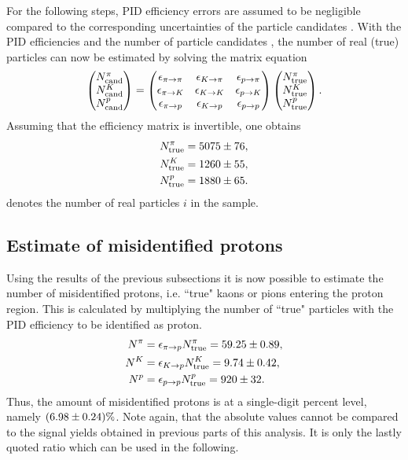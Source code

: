For the following steps, PID efficiency errors are assumed to be negligible compared to the corresponding uncertainties of the particle candidates .
With the PID efficiencies  and the number of particle candidates , the number of real (true) particles can now be estimated by solving the matrix equation
\begin{align*}
    \begin{pmatrix} 
        N_{\text{cand}}^{\pi} \\ N_{\text{cand}}^{{K}} \\ N_{\text{cand}}^{{p}}
    \end{pmatrix}
    =
    \begin{pmatrix}
       \epsilon_{{\pi}\rightarrow{\pi}}     & \epsilon_{{{K}}\rightarrow{\pi}}     & \epsilon_{{{p}}\rightarrow{\pi}} \\
       \epsilon_{{\pi}\rightarrow{{\ensuremath{K}}}}   & \epsilon_{{{K}}\rightarrow{{\ensuremath{K}}}}   & \epsilon_{{{p}}\rightarrow{{\ensuremath{K}}}} \\
       \epsilon_{{\pi}\rightarrow{{\ensuremath{p}}}} & \epsilon_{{{K}}\rightarrow{{\ensuremath{p}}}} & \epsilon_{{{p}}\rightarrow{{\ensuremath{p}}}} 
    \end{pmatrix}
    \begin{pmatrix} 
        N_{\text{true}}^{\pi} \\ N_{\text{true}}^{{K}} \\ N_{\text{true}}^{{p} }
    \end{pmatrix}.
\end{align*}
Assuming that the efficiency matrix is invertible, one obtains
\begin{align}
    N_{\text{true}}^{\pi}     &= 5075 \pm 76, \\ 
    N_{\text{true}}^{{K}}   &= 1260 \pm 55, \\ 
    N_{\text{true}}^{{p}} &= 1880 \pm 65.
\end{align}
 denotes the number of real particles $i$ in the sample.

\subsection{Estimate of misidentified protons}
Using the results of the previous subsections it is now possible to estimate the number of misidentified protons, i.e. ``true" kaons or pions entering the proton region.
This is calculated by multiplying the number of ``true" particles  with the PID efficiency  to be identified as proton. 
\begin{align}
    N^{\pi}     &= \epsilon_{{\pi}\rightarrow{{\ensuremath{p}}}} N_{\text{true}}^{\pi}         = 59.25 \pm 0.89, \\  
    N^{{K}}   &= \epsilon_{{{K}}\rightarrow{{\ensuremath{p}}}} N_{\text{true}}^{{K}}     = 9.74 \pm 0.42, \\ 
    N^{{p}} &= \epsilon_{{{p}}\rightarrow{{\ensuremath{p}}}} N_{\text{true}}^{{p}} = 920 \pm 32.
\end{align}
Thus, the amount of misidentified protons is at a single-digit percent level, namely $(6.98 \pm 0.24)\%$. 
Note again, that the absolute values cannot be compared to the signal yields obtained in previous parts of this analysis.
It is only the lastly quoted ratio which can be used in the following.

